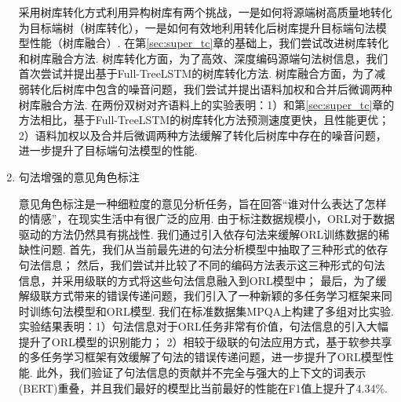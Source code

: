 \begin{cabstract}
\begin{enumerate}
              采用树库转化方式利用异构树库有两个挑战，一是如何将源端树高质量地转化为目标端树（树库转化），一是如何有效地利用转化后树库提升目标端句法模型性能（树库融合）.
              在第\ref{sec:super_tc}章的基础上，我们尝试改进树库转化和树库融合方法.
              树库转化方面，为了高效、深度编码源端句法树信息，我们首次尝试并提出基于Full-TreeLSTM的树库转化方法.
              树库融合方面，为了减弱转化后树库中包含的噪音问题，我们尝试并提出语料加权和合并后微调两种树库融合方法.
              在两份双树对齐语料上的实验表明：1）和第\ref{sec:super_tc}章的方法相比，基于Full-TreeLSTM的树库转化方法预测速度更快，且性能更优；
              2）语料加权以及合并后微调两种方法缓解了转化后树库中存在的噪音问题，进一步提升了目标端句法模型的性能.

        \item 句法增强的意见角色标注

              意见角色标注是一种细粒度的意见分析任务，旨在回答“谁对什么表达了怎样的情感”，在现实生活中有很广泛的应用. %
              由于标注数据规模小，ORL对于数据驱动的方法仍然具有挑战性.
              我们通过引入依存句法来缓解ORL训练数据的稀缺性问题.
              首先，我们从当前最先进的句法分析模型中抽取了三种形式的依存句法信息；
              然后，我们尝试并比较了不同的编码方法表示这三种形式的句法信息，并采用级联的方式将这些句法信息融入到ORL模型中；
              最后，为了缓解级联方式带来的错误传递问题，我们引入了一种新颖的多任务学习框架来同时训练句法模型和ORL模型.
              我们在标准数据集MPQA上构建了多组对比实验. 实验结果表明：1）句法信息对于ORL任务非常有价值，句法信息的引入大幅提升了ORL模型的识别能力；
              2）相较于级联的句法应用方式，基于软参共享的多任务学习框架有效缓解了句法的错误传递问题，进一步提升了ORL模型性能.
              此外，我们验证了句法信息的贡献并不完全与强大的上下文的词表示(BERT)重叠，并且我们最好的模型比当前最好的性能在F1值上提升了4.34\%.


\end{enumerate}
\end{cabstract}
